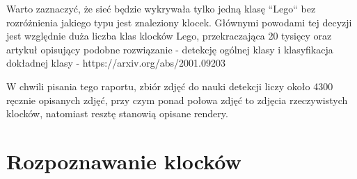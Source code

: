 \documentclass[]{article}
\begin{document}
	\par
	Warto zaznaczyć, że sieć będzie wykrywała tylko jedną klasę “Lego“ bez rozróżnienia jakiego typu jest znaleziony klocek.
	Głównymi powodami tej decyzji jest względnie duża liczba klas klocków Lego,
	przekraczająca 20 tysięcy oraz artykuł opisujący podobne rozwiązanie - detekcję
	ogólnej klasy i klasyfikacja dokładnej klasy - https://arxiv.org/abs/2001.09203
	
	
	\par W chwili pisania tego raportu, zbiór zdjęć do nauki detekcji liczy około 4300 ręcznie opisanych zdjęć, przy czym ponad połowa zdjęć to zdjęcia rzeczywistych klocków, natomiast resztę stanowią opisane rendery. 
	
	\section{Rozpoznawanie klocków}
	
\end{document}
